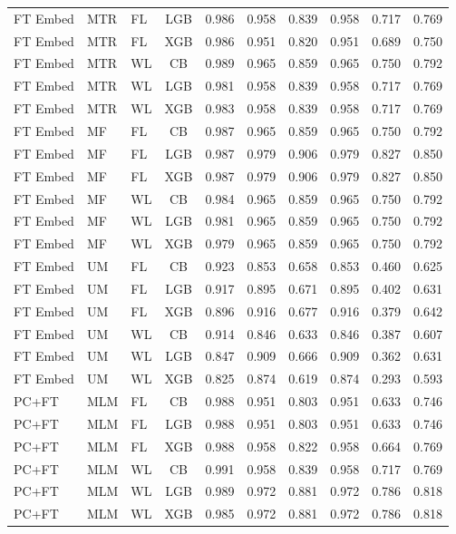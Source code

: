 \documentclass[9pt,a4paper]{article}
\begin{document}
\begin{scriptsize}
\begin{longtable}{lllcrrrrrr}
FT Embed & MTR & FL & LGB & 0.986 & 0.958 & 0.839 & 0.958 & 0.717 & 0.769 \\
FT Embed & MTR & FL & XGB & 0.986 & 0.951 & 0.820 & 0.951 & 0.689 & 0.750 \\
FT Embed & MTR & WL & CB  & 0.989 & 0.965 & 0.859 & 0.965 & 0.750 & 0.792 \\
FT Embed & MTR & WL & LGB & 0.981 & 0.958 & 0.839 & 0.958 & 0.717 & 0.769 \\
FT Embed & MTR & WL & XGB & 0.983 & 0.958 & 0.839 & 0.958 & 0.717 & 0.769 \\
FT Embed & MF  & FL & CB  & 0.987 & 0.965 & 0.859 & 0.965 & 0.750 & 0.792 \\
FT Embed & MF  & FL & LGB & 0.987 & 0.979 & 0.906 & 0.979 & 0.827 & 0.850 \\
FT Embed & MF  & FL & XGB & 0.987 & 0.979 & 0.906 & 0.979 & 0.827 & 0.850 \\
FT Embed & MF  & WL & CB  & 0.984 & 0.965 & 0.859 & 0.965 & 0.750 & 0.792 \\
FT Embed & MF  & WL & LGB & 0.981 & 0.965 & 0.859 & 0.965 & 0.750 & 0.792 \\
FT Embed & MF  & WL & XGB & 0.979 & 0.965 & 0.859 & 0.965 & 0.750 & 0.792 \\
FT Embed & UM  & FL & CB  & 0.923 & 0.853 & 0.658 & 0.853 & 0.460 & 0.625 \\
FT Embed & UM  & FL & LGB & 0.917 & 0.895 & 0.671 & 0.895 & 0.402 & 0.631 \\
FT Embed & UM  & FL & XGB & 0.896 & 0.916 & 0.677 & 0.916 & 0.379 & 0.642 \\
FT Embed & UM  & WL & CB  & 0.914 & 0.846 & 0.633 & 0.846 & 0.387 & 0.607 \\
FT Embed & UM  & WL & LGB & 0.847 & 0.909 & 0.666 & 0.909 & 0.362 & 0.631 \\
FT Embed & UM  & WL & XGB & 0.825 & 0.874 & 0.619 & 0.874 & 0.293 & 0.593 \\
\midrule
PC+FT & MLM & FL & CB  & 0.988 & 0.951 & 0.803 & 0.951 & 0.633 & 0.746 \\
PC+FT & MLM & FL & LGB & 0.988 & 0.951 & 0.803 & 0.951 & 0.633 & 0.746 \\
PC+FT & MLM & FL & XGB & 0.988 & 0.958 & 0.822 & 0.958 & 0.664 & 0.769 \\
PC+FT & MLM & WL & CB  & 0.991 & 0.958 & 0.839 & 0.958 & 0.717 & 0.769 \\
PC+FT & MLM & WL & LGB & 0.989 & 0.972 & 0.881 & 0.972 & 0.786 & 0.818 \\
PC+FT & MLM & WL & XGB & 0.985 & 0.972 & 0.881 & 0.972 & 0.786 & 0.818 \\

\end{longtable}
\end{scriptsize}
\end{document}
